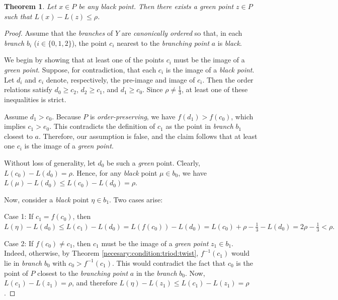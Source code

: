 \documentclass[12pt,reqno]{amsart}
\newtheorem{theorem}{Theorem}[section]
\theoremstyle{definition}
\theoremstyle{remark}
\theoremstyle{assumption}
\numberwithin{equation}{section}
\begin{document}
\begin{theorem}\label{green:black:movement}
	Let $x \in P$ be any black point. Then there exists a green point $z \in P$ such that $L(x) - L(z) \leqslant \rho$.
\end{theorem}

\begin{proof}
	Assume that the \emph{branches} of $Y$ are \emph{canonically ordered} so that, in each \emph{branch} $b_i$ ($i \in \{0,1,2\}$), the point $c_i$ nearest to the \emph{branching point} $a$ is \emph{black}.  
	
	We begin by showing that at least one of the points $c_i$ must be the image of a \emph{green point}. Suppose, for contradiction, that each $c_i$ is the image of a \emph{black point}. Let $d_i$ and $e_i$ denote, respectively, the pre-image and image of $c_i$. Then the order relations satisfy $d_0 \geqslant c_2$, $d_2 \geqslant c_1$, and $d_1 \geqslant c_0$. Since $\rho \neq \frac{1}{3}$, at least one of these inequalities is strict.  
	
	Assume $d_1 > c_0$. Because $P$ is \emph{order-preserving}, we have $f(d_1) > f(c_0)$, which implies $c_1 > e_0$. This contradicts the definition of $c_1$ as the point in \emph{branch} $b_1$ closest to $a$. Therefore, our assumption is false, and the claim follows that at least one $c_i$ is the image of a \emph{green point}.  
	
	Without loss of generality, let $d_0$ be such a \emph{green} point. Clearly, $L(c_0) - L(d_0) = \rho$. Hence, for any \emph{black} point $\mu \in b_0$, we have $L(\mu) - L(d_0) \leqslant L(c_0) - L(d_0) = \rho$.  
	
			\smallskip 
		\smallskip 
		\smallskip
		\smallskip 
		\smallskip
	
	
	Now, consider a \emph{black} point $\eta \in b_1$. Two cases arise:  
	
	Case 1: If $c_1 = f(c_0)$, then
	$L(\eta) - L(d_0) \leqslant L(c_1) - L(d_0) = L(f(c_0)) - L(d_0) = L(c_0) + \rho - \tfrac{1}{3} - L(d_0) = 2\rho - \tfrac{1}{3} <  \rho.
	$
	
	\smallskip 
	\smallskip
	
		
		
	Case 2: If $f(c_0) \neq c_1$, then $c_1$ must be the image of a \emph{green point} $z_1 \in b_1$. Indeed, otherwise,  by Theorem \ref{necesary:condition:triod:twist}, $f^{-1}(c_1)$ would lie in \emph{branch} $b_0$ with $c_0 > f^{-1}(c_1)$. This would contradict the fact that $c_0$ is the point of $P$ closest to the \emph{branching point} $a$ in the \emph{branch} $b_0$. Now, $L(c_1) - L(z_1) = \rho$, and therefore $L(\eta) - L(z_1) \leqslant L(c_1) - L(z_1) = \rho$.  
	

\end{proof}
\end{document}
